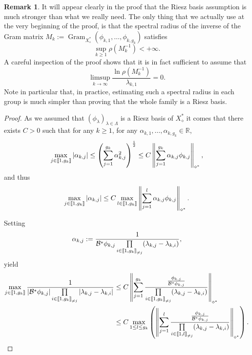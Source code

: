 \documentclass[11pt]{article}
\theoremstyle{definition}
\newtheorem{rema}[theo]{Remark}
\numberwithin{equation}{section}
\numberwithin{figure}{section}
\numberwithin{table}{section}
\newcommand{\llbracket}{\mathopen{[\mkern -2.7mu[}}
\newcommand{\rrbracket}{\mathclose{]\mkern -2.7mu]}}
\newcommand{\inter}[2]{\llbracket #1,#2 \rrbracket}
\newcommand{\interexclu}[3]{\llbracket #1,#2\rrbracket_{\neq #3}}
\newcommand\Bs{\mathcal{B}^*}
\newcommand{\Xalphas}{X_\diamond^*}
\newcommand{\normeXalphas}[1]{\left\| #1 \right\|_{\diamond^*}}
\newcommand{\n}{g}
\newcommand{\R}{\mathbb{R}}
\DeclareMathOperator{\Gram}{Gram}
\begin{document}
\begin{rema}
It will appear clearly in the proof that the Riesz basis assumption is much stronger than what we really need. The only thing that we actually use at the very beginning of the proof, is that the spectral radius of the inverse of the Gram matrix $M_k:={\Gram}_{\Xalphas}(\phi_{k,1},\dotsc,\phi_{k,\n_k})$ satisfies
\[
\sup_{k\geq 1} \rho(M_k^{-1}) < +\infty.
\]
A careful inspection of the proof shows that it is in fact sufficient to assume that
\[
\limsup_{k\to \infty} \frac{\ln \rho(M_k^{-1})}{\lambda_{k,1}} = 0.
\]
Note in particular that, in practice, estimating such a spectral radius in each group is much simpler than proving that the whole family is a Riesz basis.
\end{rema}

\begin{proof}
As we assumed that $(\phi_\lambda)_{\lambda \in \Lambda}$ is a Riesz basis of $\Xalphas$ it comes that there exists $C>0$ such that for any $k \geq 1$, for any $\alpha_{k,1}, \dots, \alpha_{k,\n_k} \in \R$,
\[
\max_{j\in \inter{1}{\n_k}} |\alpha_{k,j}| \leq \left(\sum_{j=1}^{\n_k} \alpha_{k,j}^2 \right)^{\frac{1}{2}}
\leq C \normeXalphas{ \sum_{j=1}^{\n_k} \alpha_{k,j} \phi_{k,j} },
\]
and thus
\[
\max_{j\in \inter{1}{\n_k}} |\alpha_{k,j}| \leq C \max\limits_{l\in \inter{1}{\n_k}} \normeXalphas{ \sum_{j=1}^{l} \alpha_{k,j} \phi_{k,j} }.
\]

\pagebreak
Setting
\[
\alpha_{k,j} := \frac{1}{ \Bs \phi_{k,j} \prod\limits_{i\in \interexclu{1}{\n_k}{j}} (\lambda_{k,j}-\lambda_{k,i})},
\]
yield
\begin{align*}
\max\limits_{j\in \inter{1}{\n_k}} \frac{1}{ | \Bs\phi_{k,j} | \prod\limits_{i\in\interexclu{1}{\n_k}{j}}|\lambda_{k,j}-\lambda_{k,i} | } &\leq C \normeXalphas{\sum\limits_{j=1}^{\n_k} \frac{ \frac{\phi_{k,j}}{\Bs \phi_{k,j}}}{\prod\limits_{i\in \interexclu{1}{\n_k}{j}} (\lambda_{k,j}-\lambda_{k,i})}}
\\
&\leq C \max\limits_{1 \leq l \leq \n_k} \left(\normeXalphas{\sum\limits_{j=1}^{l} \frac{ \frac{\phi_{k,j}}{\Bs \phi_{k,j}}}{\prod\limits_{i\in \interexclu{1}{l}{j}} (\lambda_{k,j}-\lambda_{k,i})}} \right).
\end{align*}




\end{proof}
\end{document}
